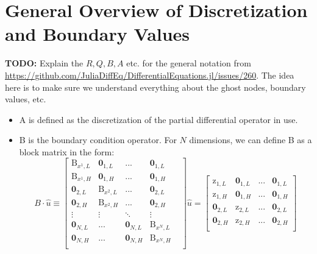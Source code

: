 \documentclass[11pt]{article}
\begin{document}
	\section{General Overview of Discretization and Boundary Values}\label{sec:general}
	\textbf{TODO:} Explain the $R, Q, B, A$ etc. for the general notation from \url{https://github.com/JuliaDiffEq/DifferentialEquations.jl/issues/260}.  The idea here is to make sure we understand everything about the ghost nodes, boundary values, etc.
	\begin{itemize}
		\item A is defined as the discretization of the partial differential operator in use.
		
		\item B is the boundary condition operator. For $N$ dimensions, we can define B as a block matrix in the form:
		\begin{equation}
		B\cdot \hat{u} \equiv 
		\begin{bmatrix}
		\text{B}_{x^{1},L} & \mathbf{0}_{1,L}       & ...    & \mathbf{0}_{1,L}\\
		\text{B}_{x^{1},H} & \mathbf{0}_{1,H}       & ...    & \mathbf{0}_{1,H}\\
		\mathbf{0}_{2,L}   & \text{B}_{x^{2},L} &   ...    & \mathbf{0}_{2,L}\\
		\mathbf{0}_{2,H}   & \text{B}_{x^{2},H} &   ...    & \mathbf{0}_{2,H}\\
		\vdots  & \vdots  & \ddots & \vdots \\
		\mathbf{0}_{N,L}       & ...    & \mathbf{0}_{N,L} & \text{B}_{x^{N},L} & \\
		\mathbf{0}_{N,H}       & ...    & \mathbf{0}_{N,H} & \text{B}_{x^{N},H} & \\
		\end{bmatrix}
		\hat{u}
		=
		\begin{bmatrix}
		\text{z}_{{1},L} & \mathbf{0}_{1,L}       & ...    & \mathbf{0}_{1,L}\\
		\text{z}_{{1},H} & \mathbf{0}_{1,H}       & ...    & \mathbf{0}_{1,H}\\
		\mathbf{0}_{2,L}   & \text{z}_{{2},L} &   ...    & \mathbf{0}_{2,L}\\
		\mathbf{0}_{2,H}   & \text{z}_{{2},H} &   ...    & \mathbf{0}_{2,H}\\

\end{bmatrix}
\end{equation}
\end{itemize}
\end{document}
